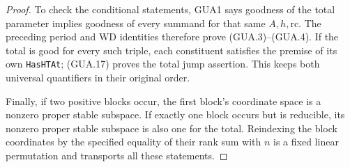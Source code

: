 \documentclass[11pt,a4paper]{article}
\numberwithin{equation}{section}
\theoremstyle{remark}\newtheorem{remark}[theorem]{Remark}
\begin{document}
\begin{proof}
To check the conditional statements, GUA1 says goodness
of the total parameter implies goodness of every
summand for that same $A,h,\mathrm{rc}$.  The preceding
period and WD identities therefore prove (GUA.3)--(GUA.4).
If the total is good for every such triple, each constituent
satisfies the premise of its own \texttt{Has\allowbreak HTAt};
(GUA.17) proves the total jump assertion.  This keeps
both universal quantifiers in their original order.

Finally, if two positive blocks occur, the first block's
coordinate space is a nonzero proper stable subspace.
If exactly one block occurs but is reducible, its
nonzero proper stable subspace is also one for the total.
Reindexing the block coordinates by the specified
equality of their rank sum with $n$ is a fixed linear
permutation and transports all these statements.
\end{proof}

\end{document}
